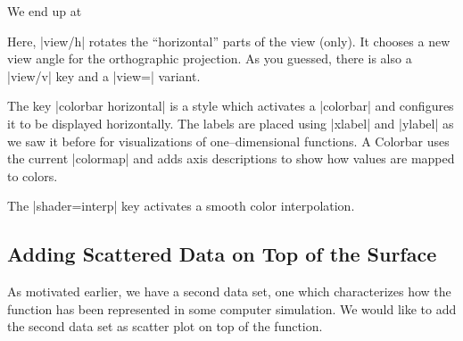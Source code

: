 We end up at
\pgfplotsexpensiveexample
\begin{codeexample}[]
\end{codeexample}
Here, |view/h| rotates the ``horizontal'' parts of the view (only). It chooses a new view angle for the orthographic projection. As you guessed, there is also a |view/v| key and a |view=| variant.

The key |colorbar horizontal| is a style which activates a |colorbar| and configures it to be displayed horizontally. The labels are placed using |xlabel| and |ylabel| as we saw it before for visualizations of one--dimensional functions. A Colorbar uses the current |colormap| and adds axis descriptions to show how values are mapped to colors.

The |shader=interp| key activates a smooth color interpolation.

\subsection{Adding Scattered Data on Top of the Surface}
As motivated earlier, we have a second data set, one which characterizes how the function has been represented in some computer simulation. We would like to add the second data set as scatter plot on top of the function. 

